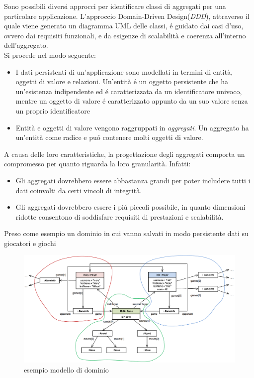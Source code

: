 Sono possibili diversi approcci per identificare classi di aggregati per una particolare applicazione.
L'approccio Domain-Driven Design(\emph{DDD}), attraverso il quale viene generato un diagramma UML delle classi,
é guidato dai casi d'uso, ovvero dai requisiti funzionali, e da esigenze di scalabilità e coerenza all'interno dell'aggregato.\\
Si procede nel modo seguente:
\begin{itemize}
    \item I dati persistenti di un'applicazione sono modellati in termini di entità, oggetti di valore e
    relazioni.
    Un'entità é un oggetto persistente che ha un'esistenza indipendente ed é caratterizzata da un identificatore
    univoco, mentre un oggetto di valore é caratterizzato appunto da un suo valore senza un proprio identificatore
    \item Entità e oggetti di valore vengono raggruppati in \emph{aggregati}.
    Un aggregato ha un'entità come radice e puó contenere molti oggetti di valore.
\end{itemize}
A causa delle loro caratteristiche, la progettazione degli aggregati comporta un compromesso per quanto riguarda
la loro granularità.
Infatti:
\begin{itemize}
    \item Gli aggregati dovrebbero essere abbastanza grandi per poter includere tutti i dati coinvolti da
    certi vincoli di integrità.
    \item Gli aggregati dovrebbero essere i piú piccoli possibile, in quanto dimensioni ridotte consentono di
    soddisfare requisiti di prestazioni e scalabilità.
\end{itemize}
Preso come esempio un dominio in cui vanno salvati in modo persistente dati su giocatori e giochi
\begin{figure}[H]
    \begin{center}
        \includegraphics[width=1.05\textwidth]{img/designAggregati}
    \end{center}
\caption{esempio modello di dominio}
    \label{modelloDominio}
\end{figure}
